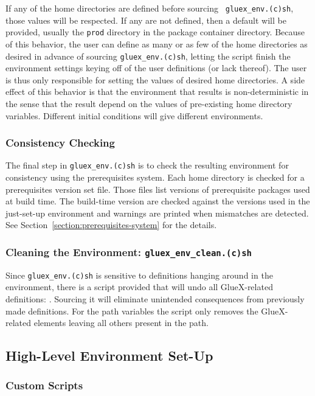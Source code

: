 \documentclass[12pt]{article}
\begin{document}
If any of the home directories are defined before sourcing {\tt
  gluex\_env.(c)sh}, those values will be respected. If any are not
defined, then a default will be provided, usually the {\tt prod}
directory in the package container directory. Because of this
behavior, the user can define as many or as few of the home
directories as desired in advance of sourcing {\tt gluex\_env.(c)sh},
letting the script finish the environment settings keying off of the
user definitions (or lack thereof). The user is thus only responsible
for setting the values of desired home directories. A side effect of
this behavior is that the environment that results is
non-deterministic in the sense that the result depend on the values
of pre-existing home directory variables. Different initial conditions
will give different environments.

\subsubsection{Consistency Checking}

The final step in {\tt gluex\_env.(c)sh} is to check the resulting
environment for consistency using the prerequisites system. Each home
directory is checked for a prerequisites version set file. Those files
list versions of prerequisite packages used at build time. The
build-time version are checked against the versions used in the
just-set-up environment and warnings are printed when mismatches are
detected. See Section~\ref{section:prerequisites-system} for the
details.

\subsubsection{Cleaning the Environment: {\tt gluex\_env\_clean.(c)sh}}

Since {\tt gluex\_env.(c)sh} is sensitive to definitions hanging
around in the environment, there is a script provided that will undo
all GlueX-related definitions: . Sourcing
it will eliminate unintended consequences from previously made
definitions. For the path variables the script only removes the
GlueX-related elements leaving all others present in the path.

\subsection{High-Level Environment Set-Up}

\subsubsection{Custom Scripts}\label{section:custom-scripts}
\end{document}
